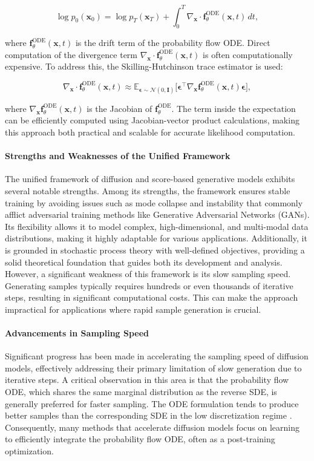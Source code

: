 \[
\log p_0(\mathbf{x}_0) = \log p_T(\mathbf{x}_T) + \int_0^T \nabla_{\mathbf{x}} \cdot \mathbf{f}_\theta^{\text{ODE}}(\mathbf{x}, t) \, dt,
\]

where \( \mathbf{f}_\theta^{\text{ODE}}(\mathbf{x}, t) \) is the drift term of the probability flow ODE. Direct computation of the divergence term \( \nabla_{\mathbf{x}} \cdot \mathbf{f}_\theta^{\text{ODE}}(\mathbf{x}, t) \) is often computationally expensive. To address this, the Skilling-Hutchinson trace estimator is used:

\[
\nabla_{\mathbf{x}} \cdot \mathbf{f}_\theta^{\text{ODE}}(\mathbf{x}, t) \approx \mathbb{E}_{\mathbf{\epsilon} \sim \mathcal{N}(0, \mathbf{I})} \big[ \mathbf{\epsilon}^\top \nabla_{\mathbf{x}} \mathbf{f}_\theta^{\text{ODE}}(\mathbf{x}, t) \mathbf{\epsilon} \big],
\]

where \( \nabla_{\mathbf{x}} \mathbf{f}_\theta^{\text{ODE}}(\mathbf{x}, t) \) is the Jacobian of \( \mathbf{f}_\theta^{\text{ODE}} \). The term inside the expectation can be efficiently computed using Jacobian-vector product calculations, making this approach both practical and scalable for accurate likelihood computation.



\paragraph{Strengths and Weaknesses of the Unified Framework}
The unified framework of diffusion and score-based generative models exhibits several notable strengths. Among its strengths, the framework ensures stable training by avoiding issues such as mode collapse and instability that commonly afflict adversarial training methods like Generative Adversarial Networks (GANs). Its flexibility allows it to model complex, high-dimensional, and multi-modal data distributions, making it highly adaptable for various applications. Additionally, it is grounded in stochastic process theory with well-defined objectives, providing a solid theoretical foundation that guides both its development and analysis. However, a significant weakness of this framework is its slow sampling speed. Generating samples typically requires hundreds or even thousands of iterative steps, resulting in significant computational costs. This can make the approach impractical for applications where rapid sample generation is crucial.

\paragraph{Advancements in Sampling Speed}
Significant progress has been made in accelerating the sampling speed of diffusion models, effectively addressing their primary limitation of slow generation due to iterative steps. A critical observation in this area is that the probability flow ODE, which shares the same marginal distribution as the reverse SDE, is generally preferred for faster sampling. The ODE formulation tends to produce better samples than the corresponding SDE in the low discretization regime \cite{song2020score}. Consequently, many methods that accelerate diffusion models focus on learning to efficiently integrate the probability flow ODE, often as a post-training optimization.

